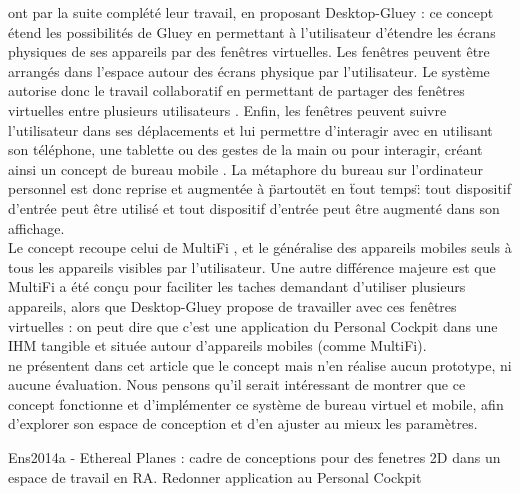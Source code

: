 
\citet{Serrano2015a} ont par la suite complété leur travail, en proposant Desktop-Gluey : ce concept étend les possibilités de Gluey en permettant à l'utilisateur d'étendre les écrans physiques de ses appareils par des fenêtres virtuelles. Les fenêtres peuvent être arrangés dans l'espace autour des écrans physique par l'utilisateur. Le système autorise donc le travail collaboratif en permettant de partager des fenêtres virtuelles entre plusieurs utilisateurs . Enfin, les fenêtres peuvent suivre l'utilisateur dans ses déplacements et lui permettre d'interagir avec en utilisant son téléphone, une tablette ou des gestes de la main ou pour interagir, créant ainsi un concept de bureau mobile . La métaphore du bureau sur l'ordinateur personnel est donc reprise et augmentée à \"partout\" et en \"tout temps\" : tout dispositif d'entrée peut être utilisé et tout dispositif d'entrée peut être augmenté dans son affichage.\\
Le concept recoupe celui de MultiFi \citep{Grubert2015}, et le généralise des appareils mobiles seuls à tous les appareils visibles par l'utilisateur. Une autre différence majeure est que MultiFi a été conçu pour faciliter les taches demandant d'utiliser plusieurs appareils, alors que Desktop-Gluey propose de travailler avec ces fenêtres virtuelles : on peut dire que c'est une application du Personal Cockpit \citep{EnsFinneganIrani2014} dans une IHM tangible et située autour d'appareils mobiles (comme MultiFi).\\
\citeauthor{Serrano2015a} ne présentent dans cet article que le concept mais n'en réalise aucun prototype, ni aucune évaluation. Nous pensons qu'il serait intéressant de montrer que ce concept fonctionne et d'implémenter ce système de bureau virtuel et mobile, afin d'explorer son espace de conception et d'en ajuster au mieux les paramètres.


Ens2014a - Ethereal Planes : cadre de conceptions pour des fenetres 2D dans un espace de travail en RA. Redonner application au Personal Cockpit

